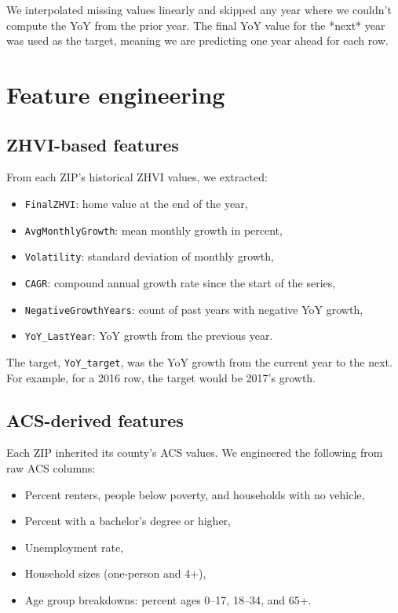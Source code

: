 We interpolated missing values linearly and skipped any year where we couldn’t compute the YoY from the prior year. The final YoY value for the *next* year was used as the target, meaning we are predicting one year ahead for each row.

\section{Feature engineering}
\subsection{ZHVI-based features}
From each ZIP’s historical ZHVI values, we extracted:
\begin{itemize}
    \item \texttt{FinalZHVI}: home value at the end of the year,
    \item \texttt{AvgMonthlyGrowth}: mean monthly growth in percent,
    \item \texttt{Volatility}: standard deviation of monthly growth,
    \item \texttt{CAGR}: compound annual growth rate since the start of the series,
    \item \texttt{NegativeGrowthYears}: count of past years with negative YoY growth,
    \item \texttt{YoY\_LastYear}: YoY growth from the previous year.
\end{itemize}

The target, \texttt{YoY\_target}, was the YoY growth from the current year to the next. For example, for a 2016 row, the target would be 2017’s growth.

\subsection{ACS-derived features}
Each ZIP inherited its county's ACS values. We engineered the following from raw ACS columns:
\begin{itemize}
    \item Percent renters, people below poverty, and households with no vehicle,
    \item Percent with a bachelor’s degree or higher,
    \item Unemployment rate,
    \item Household sizes (one-person and 4+),
    \item Age group breakdowns: percent ages 0–17, 18–34, and 65+.
\end{itemize}


